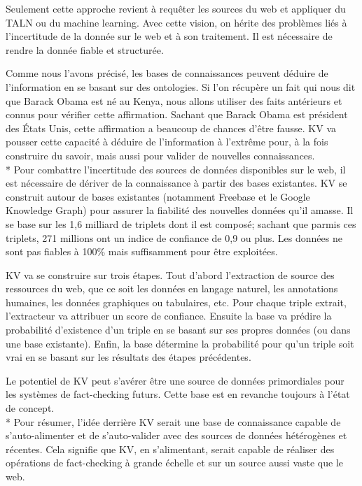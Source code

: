 Seulement cette approche revient à requêter les sources du web et appliquer du TALN ou du machine learning. Avec cette vision, on hérite des problèmes liés à l'incertitude de la donnée sur le web et à son traitement. Il est nécessaire de rendre la donnée fiable et structurée.

Comme nous l'avons précisé, les bases de connaissances peuvent déduire de l'information en se basant sur des ontologies. Si l'on récupère un fait qui nous dit que Barack Obama est né au Kenya, nous allons utiliser des faits antérieurs et connus pour vérifier cette affirmation. Sachant que Barack Obama est président des États Unis, cette affirmation a beaucoup de chances d'être fausse. KV va pousser cette capacité à déduire de l'information à l'extrême pour, à la fois construire du savoir, mais aussi pour valider de nouvelles connaissances.
\\*
Pour combattre l'incertitude des sources de données disponibles sur le web, il est nécessaire de dériver de la connaissance à partir des bases existantes. KV se construit autour de bases existantes (notamment Freebase et le Google Knowledge Graph) pour assurer la fiabilité des nouvelles données qu'il amasse. Il se base sur les 1,6 milliard de triplets dont il est composé; sachant que parmis ces triplets, 271 millions ont un indice de confiance de 0,9 ou plus. Les données ne sont pas fiables à 100\% mais suffisamment pour être exploitées.

KV va se construire sur trois étapes. Tout d'abord l'extraction de source des ressources du web, que ce soit les données en langage naturel, les annotations humaines, les données graphiques ou tabulaires, etc. Pour chaque triple extrait, l'extracteur va attribuer un score de confiance. Ensuite la base va prédire la probabilité d'existence d'un triple en se basant sur ses propres données (ou dans une base existante). Enfin, la base détermine la probabilité pour qu'un triple soit vrai en se basant sur les résultats des étapes précédentes.

Le potentiel de KV peut s'avérer être une source de données primordiales pour les systèmes de fact-checking futurs. Cette base est en revanche toujours à l'état de concept.
\\*
Pour résumer, l'idée derrière KV serait une base de connaissance capable de s'auto-alimenter et de s'auto-valider avec des sources de données hétérogènes et récentes. Cela signifie que KV, en s'alimentant, serait capable de réaliser des opérations de fact-checking à grande échelle et sur un source aussi vaste que le web.

